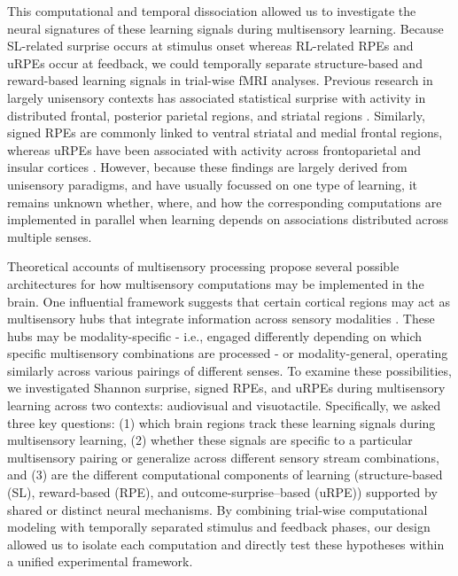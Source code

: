 \documentclass{article}
\begin{document}
This computational and temporal dissociation allowed us to investigate the neural signatures of these learning signals during multisensory learning. Because SL-related surprise occurs at stimulus onset whereas RL-related RPEs and uRPEs occur at feedback, we could temporally separate structure-based and reward-based learning signals in trial-wise fMRI analyses. Previous research in largely unisensory contexts has associated statistical surprise with activity in distributed frontal, posterior parietal regions, and striatal regions \cite{konovalov2018neurocomputational, visalli2019bayesian, o2013dissociable, corlett2022meta}. Similarly, signed RPEs are commonly linked to ventral striatal and medial frontal regions, whereas uRPEs have been associated with activity across frontoparietal and insular cortices \cite{garrison2013prediction, fouragnan2018separate, corlett2022meta}. However, because these findings are largely derived from unisensory paradigms, and have usually focussed on one type of learning,  it remains unknown whether, where, and how the corresponding computations are implemented in parallel when learning depends on associations distributed across multiple senses.\newline

Theoretical accounts of multisensory processing propose several possible architectures for how multisensory computations may be implemented in the brain. One influential framework suggests that certain cortical regions may act as multisensory hubs that integrate information across sensory modalities \cite{driver2008multisensory}. These hubs may be modality-specific - i.e., engaged differently depending on which specific multisensory combinations are processed - or modality-general, operating similarly across various pairings of different senses. To examine these possibilities, we investigated Shannon surprise, signed RPEs, and uRPEs during multisensory learning across two contexts: audiovisual and visuotactile. Specifically, we asked three key questions: (1) which brain regions track these learning signals during multisensory learning, (2) whether these signals are specific to a particular multisensory pairing or generalize across different sensory stream combinations, and (3) are the different computational components of learning (structure-based (SL), reward-based (RPE), and outcome-surprise–based (uRPE)) supported by shared or distinct neural mechanisms. By combining trial-wise computational modeling with temporally separated stimulus and feedback phases, our design allowed us to isolate each computation and directly test these hypotheses within a unified experimental framework.\newline
\end{document}
